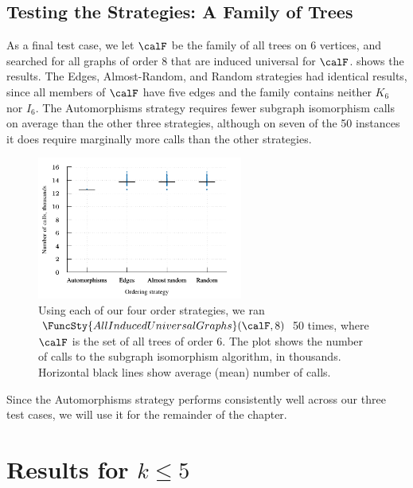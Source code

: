 \subsection{Testing the Strategies: A Family of Trees}

As a final test case, we let $\calF$ be the family of all trees on 6 vertices,
and searched for all graphs of order 8 that are induced universal for $\calF$.
 shows the results. The Edges, Almost-Random,
and Random strategies had identical results, since all members of $\calF$ have five
edges and the family contains neither $K_6$ nor $I_6$.  The Automorphisms strategy
requires fewer subgraph isomorphism calls on average than the other three strategies,
although on seven of the 50 instances it does require marginally more calls than
the other strategies.

\begin{figure}[htb]
    \centering

    \includegraphics*[width=0.601\textwidth]{15-universal-graphs/img/second-experiment-plot-using-trees}

    \caption{Using each of our four order strategies, we ran
        $\FuncSty{AllInducedUniversalGraphs}(\calF,8)$ 50 times, where
        $\calF$ is the set of all trees of order 6. The plot
        shows the number of calls to the subgraph isomorphism algorithm, in thousands.
        Horizontal black lines show average (mean) number of calls.}
\label{fig:second-experiment-using-trees}
\end{figure}

Since the Automorphisms strategy performs consistently well across our three test
cases, we will use it for the remainder of the chapter.

\section{Results for \texorpdfstring{$k \leq 5$}{k<=5}}\label{sec:results5}

